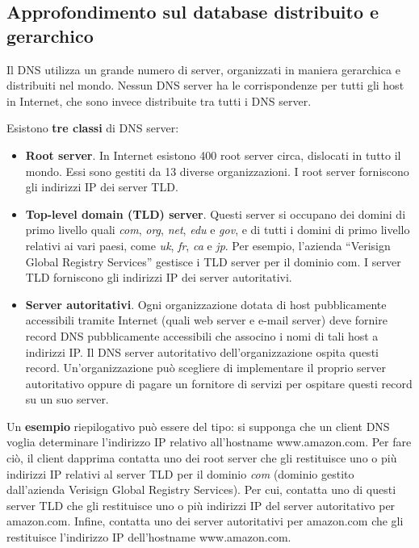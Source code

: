 \documentclass[a4paper]{article}
\begin{document}
	\newpage
	
	\subsection{Approfondimento sul database distribuito e gerarchico}
	
	Il DNS utilizza un grande numero di server, organizzati in maniera gerarchica e distribuiti nel mondo. Nessun DNS server ha le corrispondenze per tutti gli host in Internet, che sono invece distribuite tra tutti i DNS server.\newline
	
	\noindent
	Esistono \textbf{tre classi} di DNS server:
	
	\begin{itemize}
		\item \textbf{Root server}. In Internet esistono 400 root server circa, dislocati in tutto il mondo. Essi sono gestiti da 13 diverse organizzazioni.\newline
		I root server forniscono gli indirizzi IP dei server TLD.
		
		\item \textbf{Top-level domain (TLD) server}. Questi server si occupano dei domini di primo livello quali \emph{com}, \emph{org}, \emph{net}, \emph{edu} e \emph{gov}, e di tutti i domini di primo livello relativi ai vari paesi, come \emph{uk}, \emph{fr}, \emph{ca} e \emph{jp}. Per esempio, l’azienda “Verisign Global Registry Services” gestisce i TLD server per il dominio com.\newline
		I server TLD forniscono gli indirizzi IP dei server autoritativi.
		
		\item \textbf{Server autoritativi}.	Ogni organizzazione dotata di host pubblicamente accessibili tramite Internet (quali web server e e-mail server) deve fornire record DNS pubblicamente accessibili che associno i nomi di tali host a indirizzi IP. Il DNS server autoritativo dell’organizzazione ospita questi record.\newline
		Un’organizzazione può scegliere di implementare il proprio server autoritativo oppure di pagare un fornitore di servizi per ospitare questi record su un suo server.
	\end{itemize}

	\noindent
	Un \textbf{esempio} riepilogativo può essere del tipo: si supponga che un client DNS voglia determinare l’indirizzo IP relativo all’hostname \textsf{www.amazon.com}.\newline
	Per fare ciò, il client dapprima contatta uno dei root server che gli restituisce uno o più indirizzi IP relativi al server TLD per il dominio \emph{com} (dominio gestito dall’azienda Verisign Global Registry Services).\newline
	Per cui, contatta uno di questi server TLD che gli restituisce uno o più indirizzi IP del server autoritativo per \textsf{amazon.com}.\newline
	Infine, contatta uno dei server autoritativi per \textsf{amazon.com} che gli restituisce l’indirizzo IP dell’hostname \textsf{www.amazon.com}.
	
\end{document}
